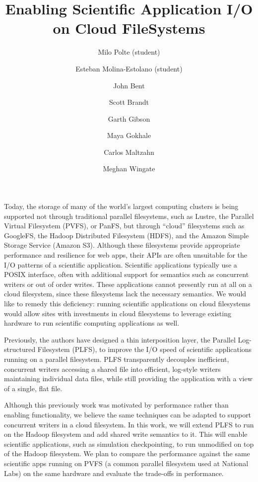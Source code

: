 \documentclass[letterpaper,10pt]{article}
\title{Enabling Scientific Application I/O on Cloud FileSystems}
\author[1]{Milo Polte (student)}
\author[2]{Esteban Molina-Estolano (student)}
\author[3]{John Bent}
\author[2]{Scott Brandt}
\author[1]{Garth Gibson}
\author[4]{Maya Gokhale}
\author[2]{Carlos Maltzahn}
\author[3]{Meghan Wingate}
\affil[1]{Carnegie Mellon University}
\affil[2]{UC Santa Cruz}
\affil[3]{Los Alamos National Laboratory}
\affil[4]{Lawrence Livermore National Laboratory}
\date{}
\begin{document}


\maketitle

    Today, the storage of many of the world's largest computing
    clusters is being supported not through traditional parallel
    filesystems, such as Lustre\cite{schwan:linux03}, the Parallel Virtual
    Filesystem (PVFS)\cite{carns:PVFS}, or PanFS\cite{nagle:sc04}, but
    through ``cloud'' filesystems such as GoogleFS\cite{ghemawat:gfs},
    the Hadoop Distributed Filesystem (HDFS)\cite{hdfs}, and the
    Amazon Simple Storage Service (Amazon S3).\cite{amazons3} Although
    these filesystems provide appropriate performance and resilience
    for web apps, their APIs are often unsuitable for the I/O patterns
    of a scientific application. Scientific applications typically use
    a POSIX interface, often with additional support for semantics
    such as concurrent writers or out of order writes. These
    applications cannot presently run at all on a cloud filesystem,
    since these filesystems lack the necessary semantics. We would
    like to remedy this deficiency: running scientific applications on
    cloud filesystems would allow sites with investments in cloud
    filesystems to leverage existing hardware to run scientific
    computing applications as well.
    

    Previously, the authors have designed a thin interposition layer,
    the Parallel Log-structured Filesystem (PLFS)\cite{plfs}, to
    improve the I/O speed of scientific applications running on a
    parallel filesystem. PLFS transparently decouples inefficient,
    concurrent writers accessing a shared file into efficient,
    log-style writers maintaining individual data files, while still
    providing the application with a view of a single, flat file.

    Although this previously work was motivated by performance rather
    than enabling functionality, we believe the same techniques can be
    adapted to support concurrent writers in a cloud filesystem. In
    this work, we will extend PLFS to run on the Hadoop filesystem and
    add shared write semantics to it. This will enable scientific
    applications, such as simulation checkpointing, to run unmodified
    on top of the Hadoop filesystem. We plan to compare the
    performance against the same scientific apps running on PVFS (a
    common parallel filesystem used at National Labs) on the same
    hardware and evaluate the trade-offs in performance. 



\end{document}
